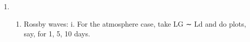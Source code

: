 \documentclass[11pt]{article}
\makeatletter
\providecommand{\tightlist}{%
      \setlength{\itemsep}{0pt}\setlength{\parskip}{0pt}}
\newcommand{\boxspacing}{\kern\kvtcb@left@rule\kern\kvtcb@boxsep}
\newcommand{\prompt}[4]{
        {\ttfamily\llap{{\color{#2}[#3]:\hspace{3pt}#4}}\vspace{-\baselineskip}}
    }
\makeatother
\begin{document}
    \begin{center}
    \end{center}
    { \hspace*{\fill} \\}
    
    \begin{center}
    \end{center}
    { \hspace*{\fill} \\}
    
    \begin{tcolorbox}[breakable, size=fbox, boxrule=1pt, pad at break*=1mm,colback=cellbackground, colframe=cellborder]
\prompt{In}{incolor}{ }{\boxspacing}
\begin{Verbatim}[commandchars=\\\{\}]

\end{Verbatim}
\end{tcolorbox}

    \begin{enumerate}
\def\labelenumi{\arabic{enumi}.}
\item
  \begin{enumerate}
  \def\labelenumii{(\alph{enumii})}
  \setcounter{enumii}{1}
  \tightlist
  \item
    Rossby waves: i. For the atmosphere case, take LG ∼ Ld and do plots,
    say, for 1, 5, 10 days.
  \end{enumerate}
\end{enumerate}
\end{document}
